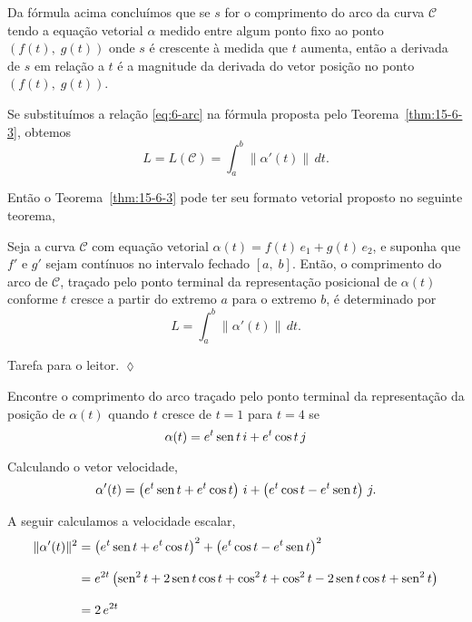 Da fórmula acima concluímos que se \(s\) for  o comprimento do arco da curva \(\mathcal{C}\) tendo a equação vetorial
\(\alpha\) medido entre algum ponto fixo ao ponto \((f(t),\; g(t))\) onde \(s\) é crescente à medida que \(t\)
aumenta, então a derivada de \(s\) em relação a \(t\) é a magnitude da derivada do vetor posição no ponto \((f(t),\;
g(t))\).

Se substituímos a relação \eqref{eq:6-arc} na fórmula proposta pelo Teorema~\ref{thm:15-6-3}, obtemos
\begin{equation*}
L=L(\mathcal{C}) = \int_{a}^{b} \|\alpha'(t)\|\, dt.
\end{equation*}

Então o Teorema~\ref{thm:15-6-3} pode ter seu formato vetorial proposto no seguinte teorema,

\begin{teo}\label{thm:15-6-4}
Seja a curva \(\mathcal{C}\) com equação vetorial \(\alpha(t) = f(t)\, e_{1} + g (t)\, e_{2}\), e suponha que \(f'\) e \(g'\) sejam contínuos no intervalo fechado \([a,\; b]\). Então, o comprimento do arco de \( \mathcal{C} \), traçado pelo ponto terminal da representação  posicional de \(\alpha(t)\) conforme \(t\) cresce a partir do extremo \(a\) para o extremo \(b\), é determinado por
\begin{equation*}
L = \int_{a}^{b} \|\alpha'(t)\|\, dt.
\end{equation*}
\end{teo}

\prova Tarefa para o leitor. \hfill \(\lozenge\)

\begin{exc}
Encontre o comprimento do arco traçado pelo ponto terminal da representação da posição de \(\alpha(t)\) quando \(t\) cresce de \(t=1\) para \(t=4\) se
\begin{equation*}
\alpha(t) = e^{t} \operatorname{sen} t \, i + e^{t} \cos t \, j
\end{equation*}
\end{exc}

\solo
Calculando o vetor velocidade,
\begin{equation*}
\alpha'(t)= \left(e^{t} \operatorname{sen} t + e^{t} \cos t\right)\, i + \left(e^{t} \cos t -e^{t} \operatorname{sen} t\right)\, j.
\end{equation*}

A seguir calculamos a velocidade escalar,
\begin{align*}
  \|\alpha'(t)\|^{2}&=\left(e^{t} \operatorname{sen} t + e^{t} \cos t\right)^{2} + \left(e^{t} \cos t -e^{t} \operatorname{sen} t\right)^{2}\\[2ex]
  &=e^{2t}\left(\operatorname{sen}^{2} t + 2\operatorname{sen} t \cos t + \cos^{2} t + \cos^{2} t - 2 \operatorname{sen} t \cos t + \operatorname{sen}^{2} t \right)\\[2ex]
  &= 2\,e^{2t}
\end{align*}

